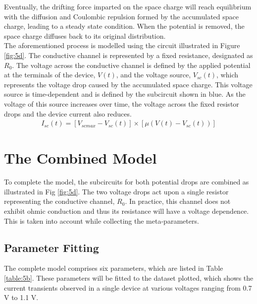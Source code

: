 \noindent Eventually, the drifting force imparted on the space charge will reach equilibrium with the diffusion and Coulombic repulsion formed by the accumulated space charge, leading to a steady state condition. When the potential is removed, the space charge diffuses back to its original distribution. \\

\noindent The aforementioned process is modelled using the circuit illustrated in Figure \ref{fig:5d}. The conductive channel is represented by a fixed resistance, designated as $R_0$. The voltage across the conductive channel is defined by the applied potential at the terminals of the device, $V(t)$, and the voltage source, $V_{sc}(t)$, which represents the voltage drop caused by the accumulated space charge. This voltage source is time-dependent and is defined by the subcircuit shown in blue. As the voltage of this source increases over time, the voltage across the fixed resistor drops and the device current also reduces.
\begin{align}
I_{sc}(t) = \left[ V_{scmax} - V_{sc}(t) \right] \times \left[ \mu \left( V(t) - V_{sc}(t) \right) \right] \label{eq:5.6} 
\end{align}

\section[The Combined Model]{The Combined Model}

\noindent To complete the model, the subcircuits for both potential drops are combined as illustrated in Fig \ref{fig:5d}. The two voltage drops act upon a single resistor representing the conductive channel, $R_0$. In practice, this channel does not exhibit ohmic conduction and thus its resistance will have a voltage dependence. This is taken into account while collecting the meta-parameters.

\subsection[Parameter Fitting]{Parameter Fitting}

The complete model comprises six parameters, which are listed in Table \ref{table:5b}. These parameters will be fitted to the dataset plotted, which shows the current transients observed in a single device at various voltages ranging from 0.7 V to 1.1 V.\\

